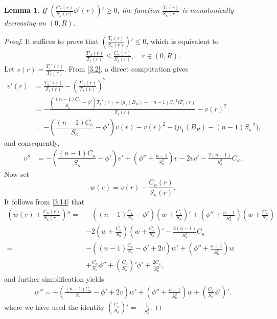 \documentclass[11pt,leqno]{amsart}
\newtheorem{lemma}{Lemma}[section]
\def\k{\kappa}
\def\k{\kappa}
\numberwithin{equation}{section}
\begin{document}
\begin{lemma}\label{lm3.3}
   If $(\frac{C_{\k}(r)}{S_{\k}(r)}\phi'(r))'\geq 0$, the function $\frac{T_{1}(r)}{S_{\k}(r)}$ is monotonically decreasing on $(0,R)$.
\end{lemma}
\begin{proof}
   It suffices to prove that  $(\frac{T_{1}(r)}{S_{\k}(r)})'\leq 0$, which is equivalent to 
\begin{align}\label{3.13}
\frac{T'_{1}(r)}{T_{1}(r)}\leq \frac{C_{\k}(r)}{S_{\k}(r)}, \quad r\in (0, R).   
\end{align}
    Let $v(r)=\frac{T_{1}'(r)}{T_{1}(r)}$. From  \eqref{3.2}, a direct computation gives 
    \begin{align*}
        v'(r)&=\frac{T_{1}''(r)}{T_{1}(r)}-(\frac{T'_{1}(r)}{T_{1}(r)})^{2}\nonumber\\
        &=-\frac{\left(\dfrac{(n-1)C_\kappa}{S_\kappa} - \phi'\right)T_{1}'(r) + \big(\mu_{1}(B_R) - (n-1)S_\kappa^{-2}\big)T_{1}(r)}{T_{1}(r)}-v(r)^{2}\nonumber\\
        &=-\left(\dfrac{(n-1)C_\kappa}{S_\kappa} - \phi'\right)v(r)-v(r)^{2}-\big(\mu_{1}(B_R) - (n-1)S_\kappa^{-2}\big),
    \end{align*}
and  consequently,
    \begin{align}\label{3.14}
        v''&=-\left(\dfrac{(n-1)C_\kappa}{S_\kappa} - \phi'\right)v'+(\phi''+\frac{n-1}{S_{\k}^{2}})v-2vv'-\frac{2(n-1)}{S_{\k}^{3}}C_{\k}.
    \end{align}
Now set $$w(r)=v(r)-\frac{C_{\k}(r)}{S_{\k}(r)}.$$
It follows from \eqref{3.14} that
\begin{align*}
    (w(r)+\frac{C_{\k}(r)}{S_{\k}(r)})''=&-\left((n-1) \frac{C_\k}{S_\k} - \phi'\right)(w+\frac{C_\k}{S_\k} )'+(\phi''+\frac{n-1}{S_{\k}^{2}})(w+\frac{C_{\k}}{S_{\k}})\\
    &-2(w+\frac{C_\k}{S_\k} )(w+\frac{C_\k}{S_\k} )'-\frac{2(n-1)}{S_{\k}^{3}}C_{\k}\\
    =&-\left((n-1) \frac{C_\k}{S_\k}  - \phi'+2v\right) w'+(\phi''+\frac{n+1}{S_{\k}^{2}})w\\
    &+\frac{C_{\k}}{S_{\k}}\phi''+(\frac{C_{\k}}{S_{\k}})'\phi'+\frac{2C_\k}{S_\k^3}, 
\end{align*}
and  further simplification yields
\begin{align}\label{3.15}
    w''=-\left(\frac{(n-1)C_\kappa}{S_\kappa} - \phi'+2v\right) w'+(\phi''+\frac{n+1}{S_{\k}^{2}})w
    +\left(\frac{C_{\k}}{S_{\k}}\phi'\right)'.
\end{align}
where we  have used the identity $(\frac{C_\k}{S_\k})'=-\frac 1 {S_\k^2}$. 


\end{proof}
\end{document}
